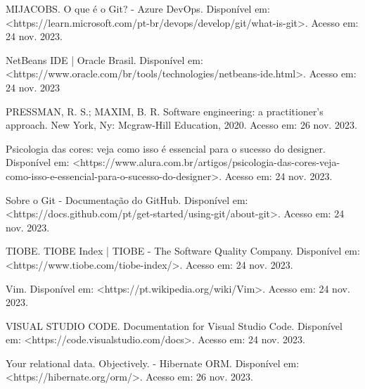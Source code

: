 \documentclass[a4paper,12pt]{article}
\begin{document}
\noindent MIJACOBS. O que é o Git? - Azure DevOps. Disponível em: <https://learn.microsoft.com/pt-br/devops/develop/git/what-is-git>. Acesso em: 24 nov. 2023. \linebreak

\noindent NetBeans IDE | Oracle Brasil. Disponível em: <https://www.oracle.com/br/tools/technologies/netbeans-ide.html>. Acesso em: 24 nov. 2023 \linebreak

\noindent PRESSMAN, R. S.; MAXIM, B. R. Software engineering: a practitioner's approach. New York, Ny: Mcgraw-Hill Education, 2020. Acesso em: 26 nov. 2023. \linebreak

\noindent Psicologia das cores: veja como isso é essencial para o sucesso do designer. 
Disponível em: <https://www.alura.com.br/artigos/psicologia-das-cores-veja-como-isso-e-essencial-para-o-sucesso-do-designer>.
Acesso em: 24 nov. 2023. \linebreak 

\noindent Sobre o Git - Documentação do GitHub. Disponível em: <https://docs.github.com/pt/get-started/using-git/about-git>. Acesso em: 24 nov. 2023. \linebreak

\noindent TIOBE. TIOBE Index | TIOBE - The Software Quality Company. Disponível em: <https://www.tiobe.com/tiobe-index/>. Acesso em: 24 nov. 2023. \linebreak

\noindent Vim. Disponível em: <https://pt.wikipedia.org/wiki/Vim>. Acesso em: 24 nov. 2023. \linebreak

\noindent VISUAL STUDIO CODE. Documentation for Visual Studio Code. Disponível em: <https://code.visualstudio.com/docs>. Acesso em: 24 nov. 2023. \linebreak

\noindent Your relational data. Objectively. - Hibernate ORM. Disponível em: <https://hibernate.org/orm/>. Acesso em: 26 nov. 2023. \linebreak

\noindent

\end{document}
